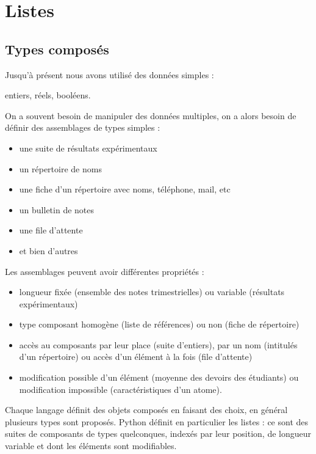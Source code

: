 \renewcommand{\FrenchLabelItem}{\textbullet}

\chapter{Listes}

\section{Types composés}
Jusqu’à présent nous avons utilisé des données simples : 

entiers, réels, booléens.

On a souvent besoin de manipuler des données multiples, on a alors besoin de définir des assemblages de types simples :

\begin{itemize}
\item une suite de résultats expérimentaux
\item un répertoire de noms
\item une fiche d’un répertoire avec noms, téléphone, mail, etc
\item un bulletin de notes
\item une file d’attente
\item et bien d’autres
\end{itemize}

Les assemblages peuvent avoir différentes propriétés :
\begin{itemize}
\item longueur fixée (ensemble des notes trimestrielles) ou variable (résultats expérimentaux)
\item type composant homogène (liste de références) ou non (fiche de répertoire)
\item accès au composants par leur place (suite d’entiers),  par un nom (intitulés d’un répertoire) ou accès d’un élément à la fois (file d’attente)
\item modification possible d’un élément (moyenne des devoirs des étudiants) ou modification impossible (caractéristiques d’un atome).
\end{itemize}

Chaque langage définit des objets composés en faisant des choix, en général plusieurs types sont proposés. Python définit en particulier les listes : ce sont des suites de composants de types quelconques, indexés par leur position, de longueur variable et dont les éléments sont modifiables. 


